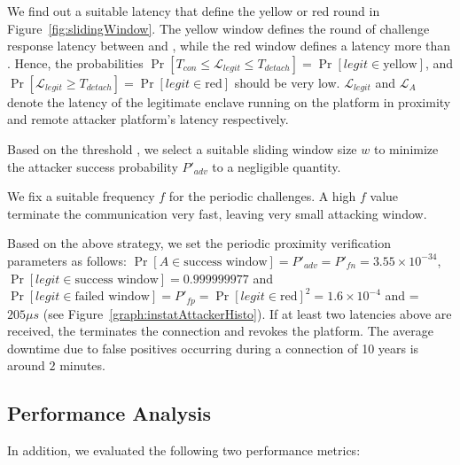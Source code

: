 \begin{mylist}
  \item We find out a suitable latency \detach that define the yellow or red round in Figure~\ref{fig:slidingWindow}. The yellow window defines the round of challenge response latency between \connect and \detach, while the red window defines a latency more than \detach. Hence, the probabilities $\Pr[T_{con}\leq \mathcal{L}_{legit}\leq T_{detach}]=\Pr[legit\in\text{yellow}]$, and $\Pr[\mathcal{L}_{legit} \geq T_{detach}]=\Pr[legit\in\text{red}]$ should be very low. $\mathcal{L}_{legit}$ and $\mathcal{L}_{A}$ denote the latency of the legitimate enclave running on the platform in proximity and remote attacker platform's latency respectively.
  \item Based on the threshold \detach, we select a suitable sliding window size $w$ to minimize the attacker success probability $P'_{adv}$ to a negligible quantity.
  \item We fix a suitable frequency $f$ for the periodic challenges. A high $f$ value terminate the communication very fast, leaving very small attacking window.
\end{mylist}

\parasaver
{} Based on the above strategy, we set the periodic proximity verification parameters as follows: $\Pr[A \in \text{success window}]=P'_{adv} = P'_{fn}= 3.55\times 10^{-34}$, $\Pr[legit \in \text{success window}]=0.999999977$ and $\Pr[legit \in \text{failed window}]=P'_{fp}=\Pr[legit\in\text{red}]^2=1.6\times10^{-4}$ and \detach = $205 \mu s$ (see Figure~\ref{graph:instatAttackerHisto}). If at least two latencies above \detach are received, the \device terminates the connection and revokes the platform. The average downtime due to false positives occurring during a connection of 10 years is around $2$ minutes. 



\subsection{Performance Analysis}

In addition, we evaluated the following two performance metrics:

